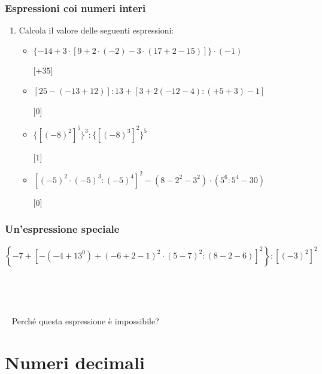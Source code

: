 \documentclass[handout]{beamer}
\theoremstyle{plain}
\begin{document}
\begin{frame}
\frametitle{Espressioni coi numeri interi}
\begin{enumerate}
  \item Calcola il valore delle seguenti espressioni:
  \vspace*{.15cm}
  \begin{itemize}
    \item $  \{-14+3 \cdot [9+ 2 \cdot (-2) - 3 \cdot (17 + 2 - 15)]\} \cdot (-1) $
    
    \hspace{\fill}[$ +35 $]%
    \vspace*{.25cm}
    \item $ [25 - (-13 +12)] : 13 + [3 + 2(-12 - 4) : (+5 + 3) - 1] $
    
    \hspace{\fill}[$ 0 $]%
    \vspace*{.25cm}
    \item $  \{[(-8)^2]^5\}^3 : \{[(-8)^3]^2\}^5 $
    
    \hspace{\fill}[$ 1 $]%
    \vspace*{.25cm}
    \item $ [(-5) ^2\cdot (-5)^3 : (-5)^4]^2 - (8 - 2^2 - 3^2) \cdot  (5^6 : 5^4 - 30) $
    
    \hspace{\fill}[$ 0 $]%
  \end{itemize}
\end{enumerate}
\end{frame}

\begin{frame}
\frametitle{Un'espressione speciale}
\footnotesize{ $ \left\{ -7 + \left[ - (-4 + 13^0) + (-6+2-1)^2 \cdot (5-7)^2 : (8-2-6) \right]^2 \right\} : \left[ (-3)^2 \right]^2 $}\pause%

  ~

  ~

  ~
\normalsize
  Perché questa espressione è \alert{impossibile}?
\end{frame}



\section{Numeri decimali}
\end{document}
